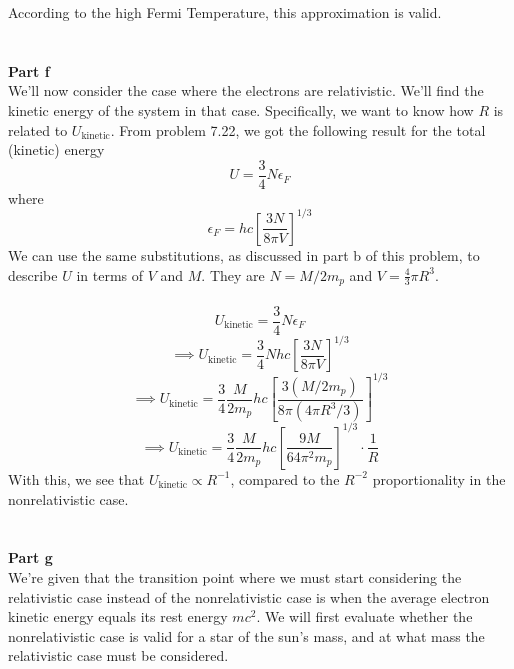\documentclass[12pt]{article}
\begin{document}
\begin{flushleft}
According to the high Fermi Temperature, this approximation is valid.\\~\\~\\



\textbf{Part f}\\
We'll now consider the case where the electrons are relativistic.
We'll find the kinetic energy of the system in that case.
Specifically, we want to know how $R$ is related to $U_\text{kinetic}$.
From problem 7.22, we got the following result for the total (kinetic) energy
\begin{equation}
    U=\frac{3}{4}N\epsilon_F
\end{equation}
where
\begin{equation}
    \epsilon_F=hc\left[\frac{3N}{8\pi V}\right]^{1/3}
\end{equation}
We can use the same substitutions, as discussed in part b of this problem, to describe $U$ in terms of $V$ and $M$.
They are $N=M/2m_p$ and $V=\frac{4}{3}\pi R^3$.\\~\\

$$U_\text{kinetic}=\frac{3}{4}N\epsilon_F$$
$$\implies U_\text{kinetic}=\frac{3}{4}Nhc\left[\frac{3N}{8\pi V}\right]^{1/3}$$
$$\implies U_\text{kinetic}=\frac{3}{4}\frac{M}{2m_p}hc\left[\frac{3(M/2m_p)}{8\pi(4\pi R^3/3)}\right]^{1/3}$$
$$\implies U_\text{kinetic}=\frac{3}{4}\frac{M}{2m_p}hc\left[\frac{9M}{64\pi^2m_p}\right]^{1/3}\cdot\frac{1}{R}$$
With this, we see that $U_\text{kinetic}\propto R^{-1}$, compared to the $R^{-2}$ proportionality in the nonrelativistic case.\\~\\~\\



\textbf{Part g}\\
We're given that the transition point where we must start considering the relativistic case instead of the nonrelativistic case is when the average electron kinetic energy equals its rest energy $mc^2$.
We will first evaluate whether the nonrelativistic case is valid for a star of the sun's mass, and at what mass the relativistic case must be considered.\\~\\


\end{flushleft}
\end{document}
